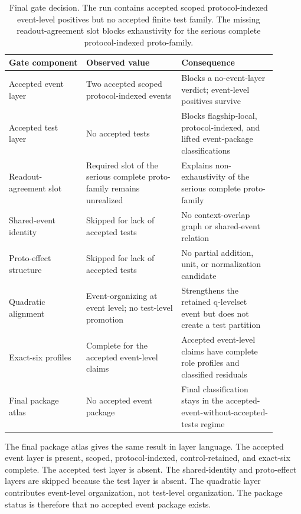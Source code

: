 \documentclass[11pt]{article}
\theoremstyle{definition}
\begin{document}
\begin{table}[t]
\centering
\small
\setlength{\tabcolsep}{4pt}
\begin{tabular}{p{0.26\linewidth}p{0.32\linewidth}p{0.32\linewidth}}
\hline
\textbf{Gate component} & \textbf{Observed value} & \textbf{Consequence} \\
\hline
Accepted event layer
&
Two accepted scoped protocol-indexed events
&
Blocks a no-event-layer verdict; event-level positives survive
\\[0.4em]
Accepted test layer
&
No accepted tests
&
Blocks flagship-local, protocol-indexed, and lifted event-package classifications
\\[0.4em]
Readout-agreement slot
&
Required slot of the serious complete proto-family remains unrealized
&
Explains non-exhaustivity of the serious complete proto-family
\\[0.4em]
Shared-event identity
&
Skipped for lack of accepted tests
&
No context-overlap graph or shared-event relation
\\[0.4em]
Proto-effect structure
&
Skipped for lack of accepted tests
&
No partial addition, unit, or normalization candidate
\\[0.4em]
Quadratic alignment
&
Event-organizing at event level; no test-level promotion
&
Strengthens the retained q-levelset event but does not create a test partition
\\[0.4em]
Exact-six profiles
&
Complete for the accepted event-level claims
&
Accepted event-level claims have complete role profiles and classified residuals
\\[0.4em]
Final package atlas
&
No accepted event package
&
Final classification stays in the accepted-event-without-accepted-tests regime
\\
\hline
\end{tabular}
\caption{Final gate decision. The run contains accepted scoped protocol-indexed event-level positives but no accepted finite test family. The missing readout-agreement slot blocks exhaustivity for the serious complete protocol-indexed proto-family.}
\label{tab:final-gate-decision}
\end{table}

The final package atlas gives the same result in layer language. The accepted event layer is present, scoped, protocol-indexed, control-retained, and exact-six complete. The accepted test layer is absent. The shared-identity and proto-effect layers are skipped because the test layer is absent. The quadratic layer contributes event-level organization, not test-level organization. The package status is therefore that no accepted event package exists.
\end{document}
